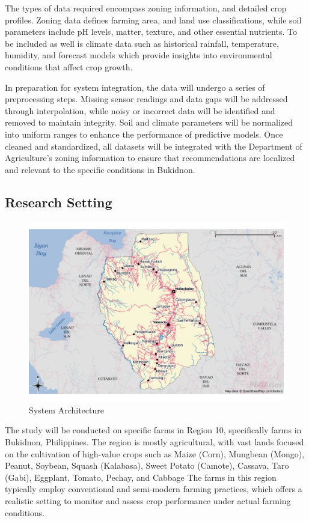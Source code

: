 {	The types of data required encompass zoning information, and detailed crop profiles. Zoning data defines farming area, and land use classifications, while soil parameters include pH levels, matter, texture, and other essential nutrients. To be included as well is climate data such as historical rainfall, temperature, humidity, and forecast models which provide insights into environmental conditions that affect crop growth.
	
	In preparation for system integration, the data will undergo a series of preprocessing steps. Missing sensor readings and data gaps will be addressed through interpolation, while noisy or incorrect data will be identified and removed to maintain integrity. Soil and climate parameters will be normalized into uniform ranges to enhance the performance of predictive models. Once cleaned and standardized, all datasets will be integrated with the Department of Agriculture’s zoning information to ensure that recommendations are localized and relevant to the specific conditions in Bukidnon.
	
	\subsection{Research Setting}
	\begin{figure}[H]
		\centering
		\caption{System Architecture}
		\label{fig:SystemSetting}
		\includegraphics[width=1\textwidth]{figures/ResearchSetting.pdf}
	\end{figure}
	
	The study will be conducted on specific farms in Region 10, specifically farms in Bukidnon, Philippines. The region is mostly agricultural, with vast lands focused on the cultivation of high-value crops such as Maize (Corn), Mungbean (Mongo), Peanut, Soybean, Squash (Kalabasa), Sweet Potato (Camote), Cassava, Taro (Gabi), Eggplant, Tomato, Pechay, and Cabbage The farms in this region typically employ conventional and semi-modern farming practices, which offers a realistic setting to monitor and assess crop performance under actual farming conditions.
	
}
